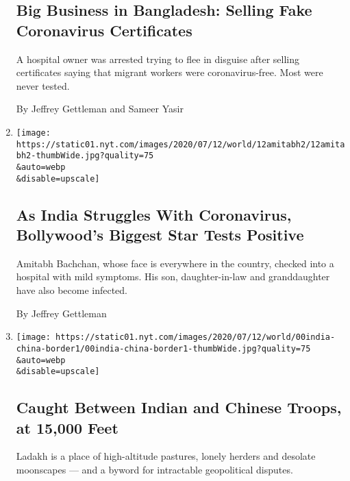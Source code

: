 \begin{enumerate}
{  \subsection{Big Business in Bangladesh: Selling Fake Coronavirus
  Certificates}\label{big-business-in-bangladesh-selling-fake-coronavirus-certificates}}

  A hospital owner was arrested trying to flee in disguise after selling
  certificates saying that migrant workers were coronavirus-free. Most
  were never tested.

  By Jeffrey Gettleman and Sameer Yasir
\item
  \href{/2020/07/12/world/asia/amitabh-bachchan-coronavirus-india-bollywood.html}{}

  \texttt{[image: https://static01.nyt.com/images/2020/07/12/world/12amitabh2/12amitabh2-thumbWide.jpg?quality=75\\\&auto=webp\\\&disable=upscale]}

  \hypertarget{as-india-struggles-with-coronavirus-bollywoods-biggest-star-tests-positive}{%
  \subsection{As India Struggles With Coronavirus, Bollywood's Biggest
  Star Tests
  Positive}\label{as-india-struggles-with-coronavirus-bollywoods-biggest-star-tests-positive}}

  Amitabh Bachchan, whose face is everywhere in the country, checked
  into a hospital with mild symptoms. His son, daughter-in-law and
  granddaughter have also become infected.

  By Jeffrey Gettleman
\item
  \href{/2020/07/11/world/asia/india-china-border-ladakh.html}{}

  \texttt{[image: https://static01.nyt.com/images/2020/07/12/world/00india-china-border1/00india-china-border1-thumbWide.jpg?quality=75\\\&auto=webp\\\&disable=upscale]}

  \hypertarget{caught-between-indian-and-chinese-troops-at-15000-feet}{%
  \subsection{Caught Between Indian and Chinese Troops, at 15,000
  Feet}\label{caught-between-indian-and-chinese-troops-at-15000-feet}}

  Ladakh is a place of high-altitude pastures, lonely herders and
  desolate moonscapes --- and a byword for intractable geopolitical
  disputes.


\end{enumerate}
